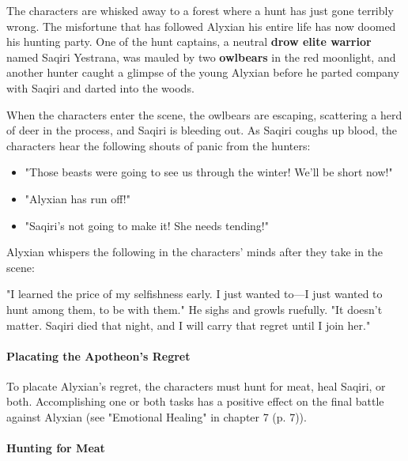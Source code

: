 \documentclass[a4paper, 11pt, bg=full, twocolumn, nooutline]{dndbook}
\begin{document}
The characters are whisked away to a forest where a hunt has just gone terribly wrong. The misfortune that has followed Alyxian his entire life has now doomed his hunting party. One of the hunt captains, a neutral \textbf{drow elite warrior} named Saqiri Yestrana, was mauled by two \textbf{owlbears} in the red moonlight, and another hunter caught a glimpse of the young Alyxian before he parted company with Saqiri and darted into the woods.

When the characters enter the scene, the owlbears are escaping, scattering a herd of deer in the process, and Saqiri is bleeding out. As Saqiri coughs up blood, the characters hear the following shouts of panic from the hunters:

\begin{itemize}
\item "Those beasts were going to see us through the winter! We'll be short now!"
\item "Alyxian has run off!"
\item "Saqiri's not going to make it! She needs tending!"
\end{itemize}

Alyxian whispers the following in the characters' minds after they take in the scene:

\begin{DndReadAloud}
"I learned the price of my selfishness early. I just wanted to---I just wanted to hunt among them, to be with them." He sighs and growls ruefully. "It doesn't matter. Saqiri died that night, and I will carry that regret until I join her."
\end{DndReadAloud}

\paragraph{Placating the Apotheon's Regret}

To placate Alyxian's regret, the characters must hunt for meat, heal Saqiri, or both. Accomplishing one or both tasks has a positive effect on the final battle against Alyxian (see "Emotional Healing" in chapter 7 (p. 7)).

\paragraph{Hunting for Meat}
\end{document}
